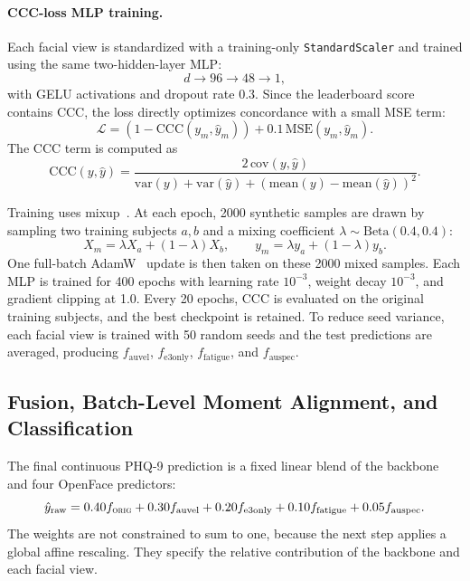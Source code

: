 \documentclass[sigconf,screen,review]{acmart}
\begin{document}
\paragraph{CCC-loss MLP training.}
Each facial view is standardized with a training-only \texttt{StandardScaler}
and trained using the same two-hidden-layer MLP:
\begin{equation}
d \rightarrow 96 \rightarrow 48 \rightarrow 1,
\label{eq:mlp-arch}
\end{equation}
with GELU activations and dropout rate $0.3$. Since the leaderboard score
contains CCC, the loss directly optimizes concordance with a small MSE term:
\begin{equation}
\mathcal{L}
=
\left(1-\mathrm{CCC}(y_m,\hat{y}_m)\right)
+0.1\,\mathrm{MSE}(y_m,\hat{y}_m).
\label{eq:ccc-loss}
\end{equation}
The CCC term is computed as
\begin{equation}
\mathrm{CCC}(y,\hat{y})
=
\frac{2\,\mathrm{cov}(y,\hat{y})}
{\mathrm{var}(y)+\mathrm{var}(\hat{y})+
(\mathrm{mean}(y)-\mathrm{mean}(\hat{y}))^2}.
\label{eq:ccc}
\end{equation}

Training uses mixup~\cite{zhang2018mixup}. At each epoch, 2000 synthetic samples
are drawn by sampling two training subjects $a,b$ and a mixing coefficient
$\lambda\sim\mathrm{Beta}(0.4,0.4)$:
\begin{equation}
X_m=\lambda X_a+(1-\lambda)X_b,
\qquad
y_m=\lambda y_a+(1-\lambda)y_b.
\label{eq:mixup}
\end{equation}
One full-batch AdamW~\cite{loshchilov2019decoupled} update is then taken on these 2000 mixed samples. Each MLP
is trained for 400 epochs with learning rate $10^{-3}$, weight decay $10^{-3}$,
and gradient clipping at 1.0. Every 20 epochs, CCC is evaluated on the original
training subjects, and the best checkpoint is retained. To reduce seed
variance, each facial view is trained with 50 random seeds and the test
predictions are averaged, producing
$f_{\text{auvel}}$, $f_{\text{e3only}}$, $f_{\text{fatigue}}$, and
$f_{\text{auspec}}$.

\subsection{Fusion, Batch-Level Moment Alignment, and Classification}
\label{sec:method-fusion}

The final continuous PHQ-9 prediction is a fixed linear blend of the backbone
and four OpenFace predictors:
\begin{equation}
\hat{y}_{\mathrm{raw}} =
0.40 f_{\textsc{orig}}
+0.30 f_{\text{auvel}}
+0.20 f_{\text{e3only}}
+0.10 f_{\text{fatigue}}
+0.05 f_{\text{auspec}}.
\label{eq:fusion}
\end{equation}
The weights are not constrained to sum to one, because the next step applies a
global affine rescaling. They specify the relative contribution of the backbone
and each facial view.
\end{document}
